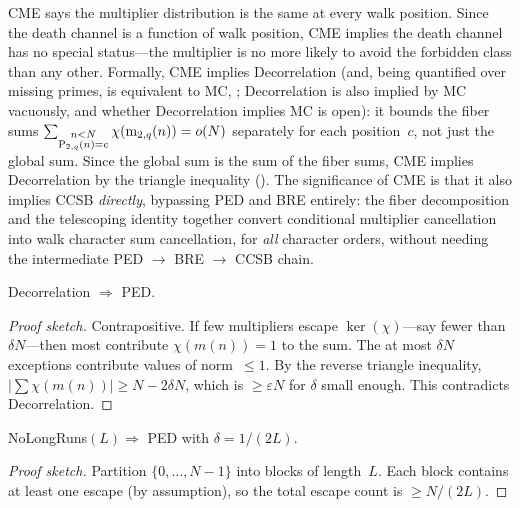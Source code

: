 CME says the multiplier distribution is the same at every walk
position.  Since the death channel is a function of walk position,
CME implies the death channel has no special status---the multiplier
is no more likely to avoid the forbidden class than any other.
Formally, CME implies Decorrelation (and, being quantified over missing
primes, is equivalent to MC, ;
Decorrelation is also implied by MC vacuously, and whether Decorrelation
implies MC is open): it bounds the
fiber sums
$\sum_{\substack{n<N \\ \mathrm{P}_{2,q}(n) = c}} \chi(\mathrm{m}_{2,q}(n)) = o(N)$
separately for each position~$c$, not just the global sum.
Since the global sum is the sum of the fiber sums, CME implies
Decorrelation by the triangle inequality
().
The significance of CME is that it also implies CCSB
\emph{directly}, bypassing PED and BRE entirely: the fiber
decomposition and the telescoping identity together convert
conditional multiplier cancellation into walk character sum
cancellation, for \emph{all} character orders, without needing the
intermediate PED $\to$ BRE $\to$ CCSB chain.

\begin{theorem}
Decorrelation $\Rightarrow$ PED.
\end{theorem}

\begin{proof}[Proof sketch]
Contrapositive.  If few multipliers escape $\ker(\chi)$---say fewer
than $\delta N$---then most contribute $\chi(m(n)) = 1$ to the sum.
The at most $\delta N$ exceptions contribute values of norm~$\leq 1$.
By the reverse triangle inequality, $|\sum \chi(m(n))| \geq N - 2\delta N$,
which is $\geq \varepsilon N$ for $\delta$ small enough.  This
contradicts Decorrelation.
\end{proof}

\begin{theorem}
NoLongRuns$(L) \Rightarrow$ PED with $\delta = 1/(2L)$.
\end{theorem}

\begin{proof}[Proof sketch]
Partition $\{0, \ldots, N{-}1\}$ into blocks of length~$L$.  Each block
contains at least one escape (by assumption), so the total escape count
is $\geq N/(2L)$.
\end{proof}

